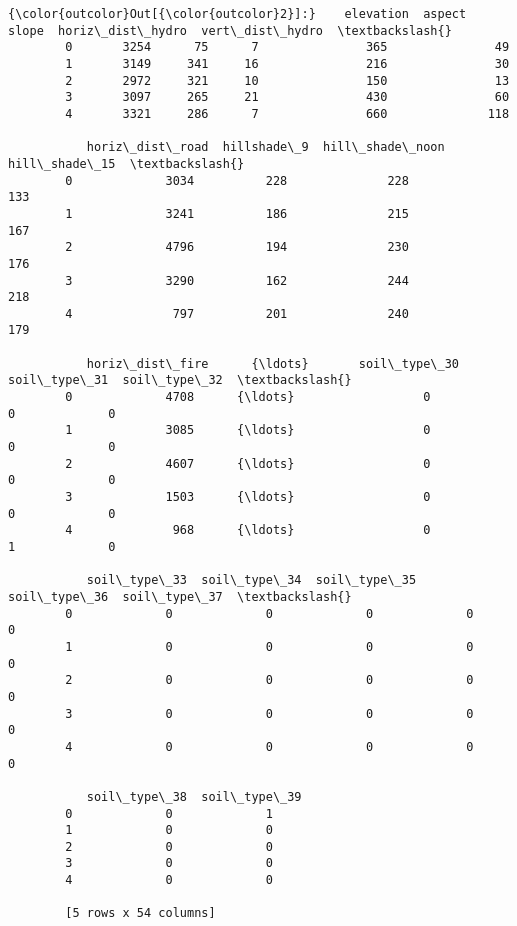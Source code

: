 \documentclass[11pt]{article}
\begin{document}
\begin{Verbatim}[commandchars=\\\{\}]
{\color{outcolor}Out[{\color{outcolor}2}]:}    elevation  aspect  slope  horiz\_dist\_hydro  vert\_dist\_hydro  \textbackslash{}
        0       3254      75      7               365               49   
        1       3149     341     16               216               30   
        2       2972     321     10               150               13   
        3       3097     265     21               430               60   
        4       3321     286      7               660              118   
        
           horiz\_dist\_road  hillshade\_9  hill\_shade\_noon  hill\_shade\_15  \textbackslash{}
        0             3034          228              228            133   
        1             3241          186              215            167   
        2             4796          194              230            176   
        3             3290          162              244            218   
        4              797          201              240            179   
        
           horiz\_dist\_fire      {\ldots}       soil\_type\_30  soil\_type\_31  soil\_type\_32  \textbackslash{}
        0             4708      {\ldots}                  0             0             0   
        1             3085      {\ldots}                  0             0             0   
        2             4607      {\ldots}                  0             0             0   
        3             1503      {\ldots}                  0             0             0   
        4              968      {\ldots}                  0             1             0   
        
           soil\_type\_33  soil\_type\_34  soil\_type\_35  soil\_type\_36  soil\_type\_37  \textbackslash{}
        0             0             0             0             0             0   
        1             0             0             0             0             0   
        2             0             0             0             0             0   
        3             0             0             0             0             0   
        4             0             0             0             0             0   
        
           soil\_type\_38  soil\_type\_39  
        0             0             1  
        1             0             0  
        2             0             0  
        3             0             0  
        4             0             0  
        
        [5 rows x 54 columns]
\end{Verbatim}
            
\end{document}
